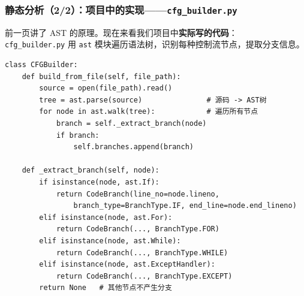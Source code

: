 \documentclass[presentation,aspectratio=169]{ctexbeamer}
\begin{document}
\begin{frame}[fragile]
\frametitle{静态分析（2/2）：项目中的实现——\texttt{cfg\_builder.py}}
{\small 前一页讲了 AST 的原理。现在来看我们项目中\textbf{实际写的代码}：\\
\texttt{cfg\_builder.py} 用 \texttt{ast} 模块遍历语法树，识别每种控制流节点，提取分支信息。}

\vspace{0.05cm}
{\scriptsize
\begin{verbatim}
class CFGBuilder:
    def build_from_file(self, file_path):
        source = open(file_path).read()
        tree = ast.parse(source)               # 源码 -> AST树
        for node in ast.walk(tree):            # 遍历所有节点
            branch = self._extract_branch(node)
            if branch:
                self.branches.append(branch)

    def _extract_branch(self, node):
        if isinstance(node, ast.If):
            return CodeBranch(line_no=node.lineno,
                branch_type=BranchType.IF, end_line=node.end_lineno)
        elif isinstance(node, ast.For):
            return CodeBranch(..., BranchType.FOR)
        elif isinstance(node, ast.While):
            return CodeBranch(..., BranchType.WHILE)
        elif isinstance(node, ast.ExceptHandler):
            return CodeBranch(..., BranchType.EXCEPT)
        return None   # 其他节点不产生分支
\end{verbatim}}
\end{frame}

\end{document}
